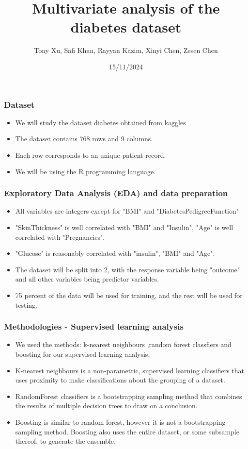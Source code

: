 \documentclass{beamer}
\title{Multivariate analysis of the diabetes dataset}
\author{Tony Xu, Safi Khan, Rayyan Kazim, Xinyi Chen, Zesen Chen}
\institute{McMaster University}
\date{15/11/2024}
\begin{document}
\frame{\titlepage}

\begin{frame}
\frametitle{Dataset}
\begin{itemize}
    \setlength\itemsep{3em}
    \item We will study the dataset diabetes obtained from kaggles \cite{Kaggles}
    \item The dataset contains $768$ rows and $9$ columns.
    \item Each row corresponds to an unique patient record.
    \item We will be using the R programming language.
\end{itemize}
\end{frame}

\begin{frame}
    \frametitle{Exploratory Data Analysis (EDA) and data preparation}
    \begin{itemize}
        \setlength\itemsep{1em}
        \item All variables are integers except for "BMI" and "DiabetesPedigreeFunction"
        \item "SkinThickness" is well correlated with "BMI" and "Insulin", "Age" is well correlated with "Pregnancies".
        \item "Glucose" is reasonably correlated with "insulin", "BMI" and "Age".
        \item The dataset will be split into 2, with the response variable being "outcome" and all other variables being predictor variables.
        \item 75 percent of the data will be used for training, and the rest will be used for testing.
    \end{itemize}
\end{frame}

\begin{frame}
    \frametitle{Methodologies - Supervised learning analysis}
        \begin{itemize}
            \setlength\itemsep{1em}
            \item We used the methods: k-nearest neighbours \cite{peterson2009k},random forest classfiers \cite{zhou2012ensemble} and boosting \cite{chen2015xgboost} for our supervised learning analysis.
            \item K-nearest neighbours \cite{peterson2009k} is a non-parametric, supervised learning classifiers that uses proximity to make classifications about the grouping of a dataset.
            \item RandomForest classifiers \cite{zhou2012ensemble} is a bootstrapping sampling method that combines the results of multiple decision trees to draw on a conclusion.
            \item Boosting \cite{chen2015xgboost} is similar to random forest, however it is not a bootstrapping sampling method. Boosting also uses the entire dataset, or some subsample thereof, to generate the ensemble.
        \end{itemize}
\end{frame}
\end{document}
